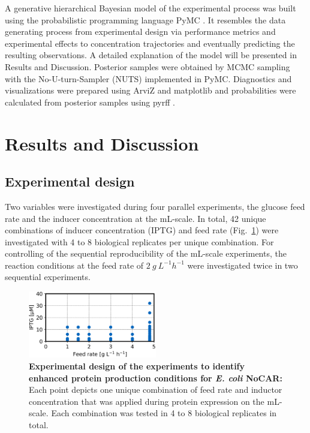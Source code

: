 \documentclass[sn-standardnature]{sn-jnl}%
\theoremstyle{thmstyleone}%
\theoremstyle{thmstyletwo}%
\theoremstyle{thmstylethree}%
\begin{document}
A generative hierarchical Bayesian model of the experimental process was built using the probabilistic programming language PyMC \cite{pymc3,pymcZenodo}.
It resembles the data generating process from experimental design via performance metrics and experimental effects to concentration trajectories and eventually predicting the resulting observations.
A detailed explanation of the model will be presented in Results and Discussion.
Posterior samples were obtained by MCMC sampling with the No-U-turn-Sampler (NUTS) implemented in PyMC.
Diagnostics and visualizations were prepared using ArviZ and matplotlib \cite{arviz,arvizPaper,matplotlib,matplotlibPaper} and probabilities were calculated from posterior samples using pyrff \cite{pyrff}.


\section{Results and Discussion}
\label{sec_results}

\subsection{Experimental design}

Two variables were investigated during four parallel experiments, the glucose feed rate and the inducer concentration at the mL-scale.
In total, 42 unique combinations of inducer concentration (IPTG) and feed rate (Fig.~\ref{fig_expdesign}) were investigated with 4 to 8 biological replicates per unique combination.
For controlling of the sequential reproducibility of the mL-scale experiments, the reaction conditions at the feed rate of 
$2\ g\ L^{-1}h^{-1}$ were investigated twice in two sequential experiments.

\begin{figure}[h]
    \centering
    \includegraphics[width=0.5\textwidth]{figures/ExpDesign.png}
    \caption{
        \textbf{Experimental design of the experiments to identify enhanced protein production conditions for \textit{E. coli} NoCAR:}
        Each point depicts one unique combination of feed rate and inductor concentration that was applied during protein expression on the mL-scale.
        Each combination was tested in 4 to 8 biological replicates in total.
    }
    \label{fig_expdesign}
\end{figure}
\end{document}

